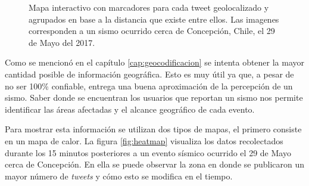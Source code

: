 	\begin{figure}[ht]
	\centering
	\hfill
  	\caption{Mapa interactivo con marcadores para cada tweet geolocalizado y agrupados en base a la distancia que existe entre ellos. Las imagenes corresponden a un sismo ocurrido cerca de  Concepción, Chile, el 29 de Mayo del 2017.}
  	\label{fig:worldmap}
  	\end{figure}
	 	
	  	
	Como se mencionó en el capítulo \ref{cap:geocodificacion} se intenta obtener la mayor cantidad posible de información geográfica. 
	Esto es muy útil ya que, a pesar de no ser 100\% confiable, entrega una buena aproximación de la percepción de un sismo. 
	Saber donde se encuentran los usuarios que reportan un sismo nos permite identificar las áreas afectadas y el alcance geográfico de cada evento. 

	
	Para mostrar esta información se utilizan dos tipos de mapas, el primero consiste en un mapa de calor. 
	La figura \ref{fig:heatmap} visualiza los datos recolectados durante los 15 minutos posteriores a un evento sísmico ocurrido el 29 de Mayo cerca de Concepción. 
	En ella se puede observar la zona en donde se publicaron un mayor número de \textit{tweets} y cómo esto se modifica en el tiempo.
	
